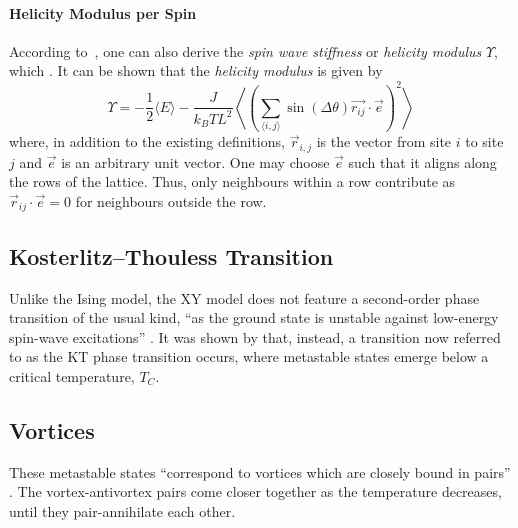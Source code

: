 		\paragraph{Helicity Modulus per Spin}
			According to~\cite{teitel_helicity}, one can also derive the \emph{spin wave stiffness} or \emph{helicity modulus} $\Upsilon$, which  \cite[p. 598]{teitel_helicity}. It can be shown that the \emph{helicity modulus} is given by
			\begin{equation}\label{eq:helicity_modulus}
				\Upsilon = -\frac{1}{2} \langle E \rangle - \frac{J}{k_B T L^2} \left\langle \left(\sum_{\langle i,j \rangle}{\sin(\Delta \theta) \vec{r_{ij}} \cdot \vec{e}}\right)^2 \right\rangle
			\end{equation}
			\cite[eq. 3.2]{teitel_helicity} where, in addition to the existing definitions, $\vec{r}_{i,j}$ is the vector from site $i$ to site $j$ and $\vec{e}$ is an arbitrary unit vector. One may choose $\vec{e}$ such that it aligns along the rows of the lattice. Thus, only neighbours within a row contribute as $\vec{r}_{ij} \cdot \vec{e} = 0$ for neighbours outside the row.
	
	\subsection{Kosterlitz–Thouless Transition}
		Unlike the Ising model, the XY model does not feature a second-order phase transition of the usual kind, \enquote{as the ground state is unstable against low-energy spin-wave excitations} \cite[p. 1190]{kosterlitz}. It was shown by \cite{kosterlitz} that, instead, a transition now referred to as the KT phase transition occurs, where metastable states emerge below a critical temperature, $T_C$.
	
	\subsection{Vortices}
		These metastable states \enquote{correspond to vortices which are closely bound in pairs} \cite[p. 1190]{kosterlitz}. The vortex-antivortex pairs come closer together as the temperature decreases, until they pair-annihilate each other.